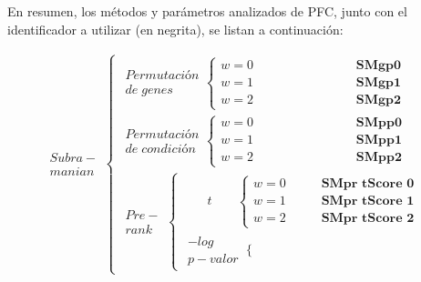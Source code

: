 \documentclass[12pt,twoside]{reedthesis}
\begin{document}
\par

En resumen, los métodos y parámetros analizados de PFC, junto con el identificador a utilizar (en negrita), se listan a continuación:
\begin{small}
\[
\begin{matrix}
\begin{matrix}Subra-\\ manian\end{matrix} \left\{\begin{matrix}
    \begin{matrix}Permutación\\ de\; genes\end{matrix} \left\{\begin{matrix}
           w=0\;\;\;\;\;\;\;\;\;\;\;\;\;\;\;\;\;\;\;\;\;\;\;\;\;\;\;\;\;\textbf{SMgp0}
        \\ w=1\;\;\;\;\;\;\;\;\;\;\;\;\;\;\;\;\;\;\;\;\;\;\;\;\;\;\;\;\;\textbf{SMgp1}
        \\ w=2\;\;\;\;\;\;\;\;\;\;\;\;\;\;\;\;\;\;\;\;\;\;\;\;\;\;\;\;\;\textbf{SMgp2}
    \end{matrix}\right.
    \\ \begin{matrix}Permutación\\ de\; condición\end{matrix} \left\{\begin{matrix}
           w=0\;\;\;\;\;\;\;\;\;\;\;\;\;\;\;\;\;\;\;\;\;\;\;\;\;\;\;\;\;\textbf{SMpp0}
        \\ w=1\;\;\;\;\;\;\;\;\;\;\;\;\;\;\;\;\;\;\;\;\;\;\;\;\;\;\;\;\;\textbf{SMpp1}
        \\ w=2\;\;\;\;\;\;\;\;\;\;\;\;\;\;\;\;\;\;\;\;\;\;\;\;\;\;\;\;\;\textbf{SMpp2}
    \end{matrix}\right.
    \\ \begin{matrix}Pre-\\ rank\end{matrix} \left\{\begin{matrix}
           \;\;\;\;\;\;\; t \;\;\;\;\;\;\; \left\{\begin{matrix}
           w=0\;\;\;\;\;\;\;\;\;\;\textbf{SMpr tScore 0}
        \\ w=1\;\;\;\;\;\;\;\;\;\;\textbf{SMpr tScore 1}
        \\ w=2\;\;\;\;\;\;\;\;\;\;\textbf{SMpr tScore 2}
    \end{matrix}\right.
    \\ \begin{matrix}-log\\ p-valor\end{matrix} \left\{\begin{matrix}

\end{matrix}
\end{matrix}
\end{matrix}
\end{matrix}\]
\end{small}
\end{document}
